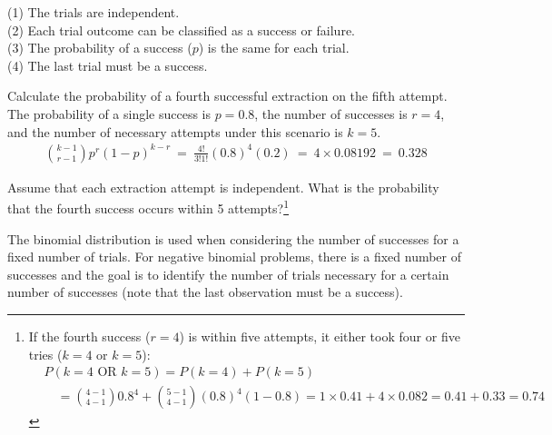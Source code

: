 \begin{tipBox}{
		(1) The trials are independent. \\
		(2) Each trial outcome can be classified as a success or failure. \\
		(3) The probability of a success ($p$) is the same for each trial. \\
		(4) The last trial must be a success.}
\end{tipBox}


\begin{example}{Calculate the probability of a fourth successful extraction on the fifth attempt.}
The probability of a single success is $p=0.8$, the number of successes is $r=4$, and the number of necessary attempts under this scenario is $k=5$.
\begin{align*}
{k-1 \choose r-1}p^r(1-p)^{k-r}\ 
	=\ \frac{4!}{3!1!} (0.8)^4 (0.2)\ 
	=\ 4 \times 0.08192\ 
	=\ 0.328
\end{align*}
\end{example}

\begin{exercise}
Assume that each extraction attempt is independent. What is the probability that the fourth success occurs within 5 attempts?\footnote{If the fourth success ($r=4$) is within five attempts, it either took four or five tries ($k=4$ or $k=5$):
\begin{align*}
& P(k=4\text{ OR }k=5) = P(k=4) + P(k=5) \\
&\quad = {4-1 \choose 4-1} 0.8^4 + {5-1 \choose 4-1} (0.8)^4(1-0.8) = 1\times 0.41 + 4\times 0.082 = 0.41 + 0.33 = 0.74
\end{align*}}
\end{exercise}

\begin{tipBox}{
The binomial distribution is used when considering the number of successes for a fixed number of trials. For negative binomial problems, there is a fixed number of successes and the goal is to identify the number of trials necessary for a certain number of successes (note that the last observation must be a success).}
\end{tipBox}

